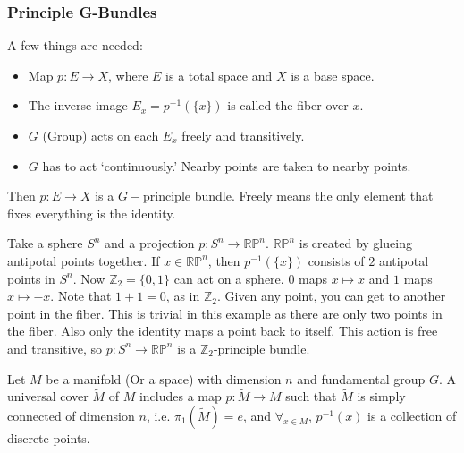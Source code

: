        \subsubsection{Principle G-Bundles}
            A few things are needed:
            \begin{itemize}
                \item Map $p:E\rightarrow X$,
                      where $E$ is a total space
                      and $X$ is a base space.
                \item The inverse-image $E_{x}=p^{-1}(\{x\})$
                      is called the fiber over $x$.
                \item $G$ (Group) acts on each $E_{x}$
                      freely and transitively.
                \item $G$ has to act `continuously.'
                      Nearby points are taken to nearby points.
            \end{itemize}
            Then $p:E\rightarrow X$ is a $G-$principle bundle. Freely
            means the only element that fixes everything is the identity.
            \begin{example}
                Take a sphere $S^{n}$ and a projection
                $p:S^{n} \rightarrow \mathbb{RP}^{n}$.
                $\mathbb{RP}^{n}$ is created by glueing
                antipotal points together.
                If $x\in \mathbb{RP}^{n}$, then $p^{-1}(\{x\})$
                consists of $2$ antipotal points in $S^{n}$.
                Now $\mathbb{Z}_{2}=\{0,1\}$
                can act on a sphere.
                $0$ maps $x\mapsto{x}$ and $1$ maps
                $x\mapsto{-x}$.
                Note that $1+1 = 0$, as in $\mathbb{Z}_{2}$.
                Given any point, you can get to another point
                in the fiber. This is trivial in this example
                as there are only two points in the fiber.
                Also only the identity maps a point back
                to itself. This action is free and transitive,
                so $p:S^{n}\rightarrow\mathbb{RP}^{n}$
                is a $\mathbb{Z}_{2}$-principle bundle.
            \end{example}
            Let $M$ be a manifold (Or a space) with dimension $n$ and
            fundamental group $G$. A universal cover $\tilde{M}$ of $M$ includes
            a map $p:\tilde{M}\rightarrow M$ such that $\tilde{M}$ is simply
            connected of dimension $n$, i.e. $\pi_{1}(\tilde{M})=e$, and
            $\forall_{x\in M}$, $p^{-1}(x)$ is a collection of discrete points.
